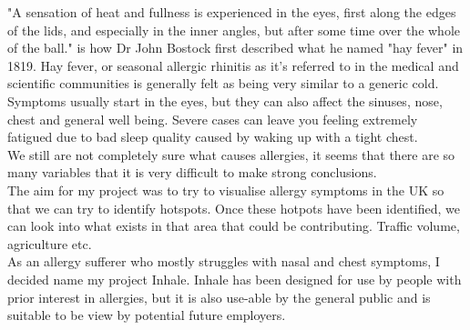 "A sensation of heat and fullness is experienced in the eyes, first along the edges of the lids, and especially in the inner angles, but after some time over the whole of the ball." is how Dr John Bostock first described what he named "hay fever" in 1819. Hay fever, or seasonal allergic rhinitis as it's referred to in the medical and scientific communities is generally felt as being very similar to a generic cold. Symptoms usually start in the eyes, but they can also affect the sinuses, nose, chest and general well being. Severe cases can leave you feeling extremely fatigued due to bad sleep quality caused by waking up with a tight chest.\\

We still are not completely sure what causes allergies, it seems that there are so many variables that it is very difficult to make strong conclusions.\\

The aim for my project was to try to visualise allergy symptoms in the UK so that we can try to identify hotspots. Once these hotpots have been identified, we can look into what exists in that area that could be contributing. Traffic volume, agriculture etc.\\

As an allergy sufferer who mostly struggles with nasal and chest symptoms, I decided name my project Inhale. Inhale has been designed for use by people with prior interest in allergies, but it is also use-able by the general public and is suitable to be view by potential future employers.